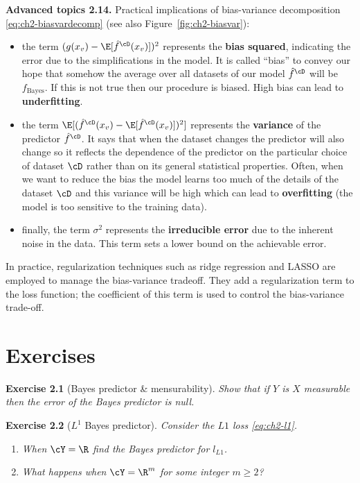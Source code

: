 \begin{tcolorbox}[advancedbox]
\textbf{Advanced topics 2.14.} Practical implications of bias-variance
decomposition \eqref{eq:ch2-biasvardecomp} (see also Figure~\ref{fig:ch2-biasvar}):
\begin{itemize}
  \item the term $(g(x_v) - \E[\hat{f}^{\cD}(x_v)])^2$ represents the \textbf{bias squared}, indicating
  the error due to the simplifications in the model. It is called ``bias''
  to convey our hope that somehow the average over all datasets of our
  model $\hat{f}^{\cD}$ will be $f_{\text{Bayes}}$. If this is not true then our procedure is biased.
  High bias can lead to \textbf{underfitting}.
  \item the term $\E[(\hat{f}^{\cD}(x_v) - \E[\hat{f}^{\cD}(x_v)])^2]$ represents the \textbf{variance} of the predictor
  $\hat{f}^{\cD}$. It says that when the dataset changes the predictor will also
  change so it reflects the dependence of the predictor on the particular
  choice of dataset $\cD$ rather than on its general statistical properties. Often,
  when we want to reduce the bias the model learns too much of the
  details of the dataset $\cD$ and this variance will be high which can lead to
  \textbf{overfitting} (the model is too sensitive to the training data).
  \item finally, the term $\sigma^2$ represents the \textbf{irreducible error} due to the inherent
  noise in the data. This term sets a lower bound on the achievable
  error.
\end{itemize}
In practice, regularization techniques such as ridge regression and
LASSO are employed to manage the bias-variance tradeoff. They add
a regularization term to the loss function; the coefficient of this term is
used to control the bias-variance trade-off.
\end{tcolorbox}

\section{Exercises}
\label{sec:ch2-exercises}

\begin{tcolorbox}[remarkbox]
\textbf{Exercise 2.1} (Bayes predictor \& mensurability). \textit{Show that if $Y$ is $X$
measurable then the error of the Bayes predictor is null.}
\end{tcolorbox}

\begin{tcolorbox}[remarkbox]
\textbf{Exercise 2.2} ($L^1$ Bayes predictor). \textit{Consider the $L1$ loss \eqref{eq:ch2-l1}.}
\begin{enumerate}
  \item \textit{When $\cY = \R$ find the Bayes predictor for $l_{L1}$.}
  \item \textit{What happens when $\cY = \R^m$ for some integer $m \ge 2$?}
\end{enumerate}
\end{tcolorbox}

